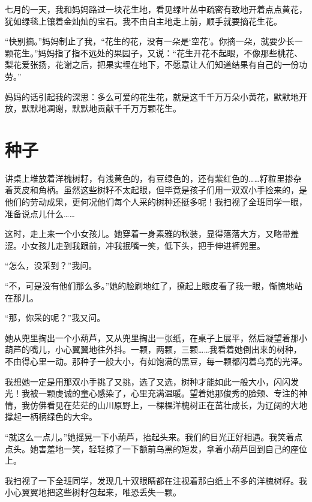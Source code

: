 \documentclass[12pt,UTF-8,openany]{ctexbook}
\begin{document}
\begin{Large}
    
    七月的一天，我和妈妈路过一块花生地，看见绿叶丛中疏密有致地开着点点黄花，犹如绿毯上镶着金灿灿的宝石。我不由自主地走上前，顺手就要摘花生花。
    
    “快别摘。”妈妈制止了我，“花生的花，没有一朵是‘空花’。你摘一朵，就要少长一颗花生。”妈妈指了指不远处的果园子，又说：“花生开花不起眼，不像那些桃花、梨花爱张扬，花谢之后，把果实埋在地下，不愿意让人们知道结果有自己的一份功劳。”
    
    妈妈的话引起我的深思：多么可爱的花生花，就是这千千万万朵小黄花，默默地开放，默默地凋谢，默默地贡献千千万万颗花生。
    
\end{Large}

\chapter{种子}

\begin{Large}
    
    讲桌上堆放着洋槐树籽，有浅黄色的，有豆绿色的，还有紫红色的……籽粒里掺杂着荚皮和角柄。虽然这些树籽不太起眼，但毕竟是孩子们用一双双小手捡来的，是他们的劳动成果，更何况他们每个人采的树种还挺多呢！我扫视了全班同学一眼，准备说点儿什么……
    
    这时，走上来一个小女孩儿。她穿着一身素雅的秋装，显得落落大方，又略带羞涩。小女孩儿走到我跟前，冲我抿嘴一笑，低下头，把手伸进裤兜里。
    
    “怎么，没采到？”我问。
    
    “不，可是没有他们那么多。”她的脸刷地红了，撩起上眼皮看了我一眼，惭愧地站在那儿。
    
    “那，你采的呢？”我又问。
    
    她从兜里掏出一个小葫芦，又从兜里掏出一张纸，在桌子上展平，然后凝望着那小葫芦的嘴儿，小心翼翼地往外抖。一颗，两颗，三颗……我看着她倒出来的树种，不由得心里一动。那种子一般大小，有如饱满的黑豆，每一颗都闪着乌亮的光泽。
    
    我想她一定是用那双小手挑了又挑，选了又选，树种才能如此一般大小，闪闪发光！我被一颗虔诚的童心感染了，心里充满温暖。望着她那俊秀的脸颊、专注的神情，我仿佛看见在茫茫的山川原野上，一棵棵洋槐树正在茁壮成长，为辽阔的大地撑起一柄柄绿色的大伞。
    
    “就这么一点儿。”她摇晃一下小葫芦，抬起头来。我们的目光正好相遇。我笑着点点头。她害羞地一笑，轻轻掠了一下额前乌黑的短发，拿着小葫芦回到自己的座位上。
    
    我扫视了一下全班同学，发现几十双眼睛都在注视着那白纸上不多的洋槐树籽。我小心翼翼地把这些树籽包起来，唯恐丢失一颗。
    
\end{Large}
\end{document}
